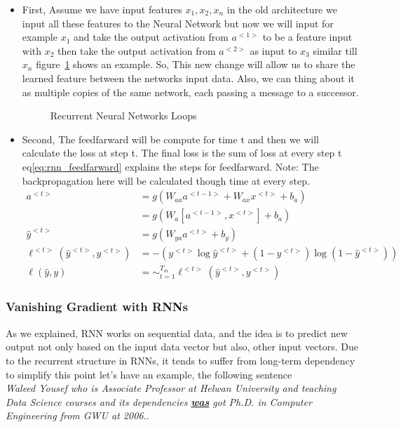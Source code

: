 \begin{itemize}
\item First, Assume we have input features $x_1, x_2, x_n$ in the old architecture we input all these features to the Neural Network but now we will input for example $x_1$ and take the output activation from $a^{<1>}$ to be a feature input with $x_2$ then take the output activation from $a^{<2>}$ as input to $x_3$ similar till $x_n$ figure~\ref{fig:RNN_Rolled_Loop} shows an example. So, This new change will allow us to share the learned feature between the networks input data. Also, we can thing about it as multiple copies of the same network, each passing a message to a successor\cite{colah}.%
\begin{figure}[!t]
  
  \caption{Recurrent Neural Networks Loops\cite{colah}}\label{fig:RNN_Rolled_Loop}
\end{figure}%
\item Second, The feedfarward will be compute for time t and then we will calculate the loss at step t. The final loss is the sum of loss at every step t eq\eqref{eq:rnn_feedfarward} explains the steps for feedfarward. Note: The backpropagation here will be calculated though time at every step.%
  \begin{subequations}\label{eq:rnn_feedfarward}
\begin{align}
  a^{<t>} & = g(W_{aa}a^{<t-1>}+ W_{ax}x^{<t>}+b_a)\\
   & = g(W_a[a^{<t-1>},x^{<t>}]+ b_a)\\
  \widehat{y}^{<t>} & = g(W_{ya}a^{<t>}+ b_y)
  \\ \ell^{<t>}(\widehat{y}^{<t>},y^{<t>}) & = - (y^{<t>} \log \widehat{y}^{<t>} + (1-y^{<t>}) \log (1-\widehat{y}^{<t>}))
\\ \ell(\widehat{y},y) & = \sim_{t=1}^{T_m} \ell^{<t>}(\widehat{y}^{<t>},y^{<t>})                                              
\end{align}
\end{subequations}%
 \end{itemize}


 \subsubsection{Vanishing Gradient with RNNs}\label{sec:RNN_Vanishing}
 
 As we explained, RNN works on sequential data, and the idea is to predict new output not only based on the input data vector but also, other input vectors. Due to the recurrent structure in RNNs, it tends to suffer from long-term dependency to simplify this point let’s have an example, the following sentence \\
 \textit{Waleed Yousef who is Associate Professor at Helwan University and teaching Data Science courses and its dependencies \textbf{\underline{was}} got Ph.D. in Computer Engineering from GWU at 2006.}.

